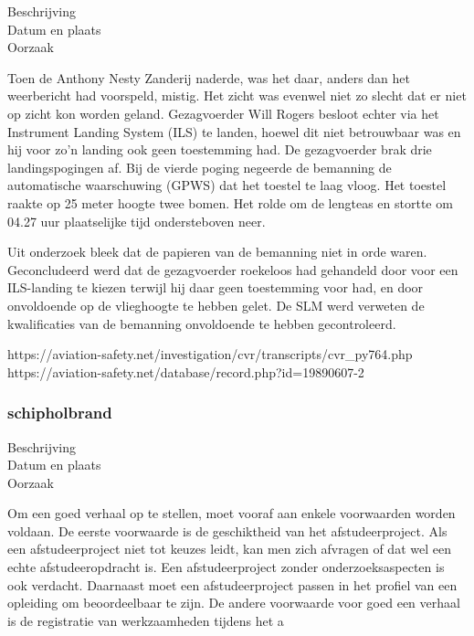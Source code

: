 	\begin{description}
	\item[Beschrijving]
	\item[Datum en plaats] 
	\item[Oorzaak]
\end{description}
Toen de Anthony Nesty Zanderij naderde, was het daar, anders dan het weerbericht had voorspeld, mistig. Het zicht was evenwel niet zo slecht dat er niet op zicht kon worden geland. Gezagvoerder Will Rogers besloot echter via het Instrument Landing System (ILS) te landen, hoewel dit niet betrouwbaar was en hij voor zo'n landing ook geen toestemming had. De gezagvoerder brak drie landingspogingen af. Bij de vierde poging negeerde de bemanning de automatische waarschuwing (GPWS) dat het toestel te laag vloog. Het toestel raakte op 25 meter hoogte twee bomen. Het rolde om de lengteas en stortte om 04.27 uur plaatselijke tijd ondersteboven neer.

Uit onderzoek bleek dat de papieren van de bemanning niet in orde waren. 
Geconcludeerd werd dat de gezagvoerder roekeloos had gehandeld door voor een ILS-landing te kiezen terwijl hij daar geen toestemming voor had, en door onvoldoende op de vlieghoogte te hebben gelet. 
De SLM werd verweten de kwalificaties van de bemanning onvoldoende te hebben gecontroleerd.

https://aviation-safety.net/investigation/cvr/transcripts/cvr_py764.php 
https://aviation-safety.net/database/record.php?id=19890607-2 



\subsubsection{schipholbrand}

	\begin{description}
	\item[Beschrijving]
	\item[Datum en plaats] 
	\item[Oorzaak]
\end{description}
Om een goed verhaal op te stellen, moet vooraf aan enkele voorwaarden
worden voldaan. De eerste voorwaarde is de geschiktheid van het
afstudeerproject. Als een afstudeerproject niet tot keuzes leidt, kan
men zich afvragen of dat wel een echte afstudeeropdracht is. Een
afstudeerproject zonder onderzoeksaspecten is ook verdacht. Daarnaast
moet een afstudeerproject passen in het profiel van een opleiding om
beoordeelbaar te zijn. De andere voorwaarde voor goed een verhaal is
de registratie van werkzaamheden tijdens het a


